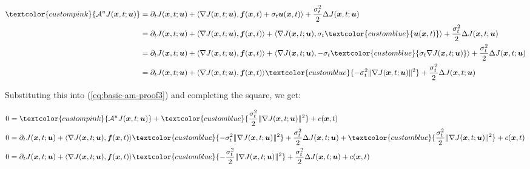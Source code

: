 \documentclass{article}
\newcommand{\bluetext}[1]{\textcolor{customblue}{#1}}
\newcommand{\pinktext}[1]{\textcolor{custompink}{#1}}
\begin{document}
\begin{small}
\begin{align}
    \pinktext{\mathcal{A}^uJ(\boldsymbol{x},t; \boldsymbol{u})}&=\partial_tJ(\boldsymbol{x},t;\boldsymbol{u})+\langle \nabla J(\boldsymbol{x},t;\boldsymbol{u}), \boldsymbol{f}(\boldsymbol{x},t)+\sigma_t\boldsymbol{u}(\boldsymbol{x},t)\rangle+\frac{\sigma_t^2}{2}\Delta J(\boldsymbol{x},t;\boldsymbol{u})\nonumber\\
    &=\partial_tJ(\boldsymbol{x},t;\boldsymbol{u})+\langle \nabla J(\boldsymbol{x},t;\boldsymbol{u}), \boldsymbol{f}(\boldsymbol{x},t)\rangle+\langle \nabla J(\boldsymbol{x},t;\boldsymbol{u}), \sigma_t\bluetext{\boldsymbol{u}(\boldsymbol{x},t)}\rangle +\frac{\sigma_t^2}{2}\Delta J(\boldsymbol{x},t;\boldsymbol{u})\nonumber\\
    &=\partial_tJ(\boldsymbol{x},t;\boldsymbol{u})+\langle \nabla J(\boldsymbol{x},t;\boldsymbol{u}), \boldsymbol{f}(\boldsymbol{x},t)\rangle+\langle \nabla J(\boldsymbol{x},t;\boldsymbol{u}), -\sigma_t\bluetext{\sigma_t\nabla J(\boldsymbol{x},t;\boldsymbol{u})}\rangle +\frac{\sigma_t^2}{2}\Delta J(\boldsymbol{x},t;\boldsymbol{u})\nonumber\\
    &=\partial_tJ(\boldsymbol{x},t;\boldsymbol{u})+\langle \nabla J(\boldsymbol{x},t;\boldsymbol{u}), \boldsymbol{f}(\boldsymbol{x},t)\rangle\bluetext{-\sigma^2_t\|\nabla J(\boldsymbol{x},t;\boldsymbol{u})\|^2} +\frac{\sigma_t^2}{2}\Delta J(\boldsymbol{x},t;\boldsymbol{u})
\end{align}
\end{small}
Substituting this into (\ref{eq:basic-am-proof3}) and completing the square, we get:
\begin{small}
\begin{align}
    0&=\pinktext{\mathcal{A}^uJ(\boldsymbol{x},t; \boldsymbol{u})}+\bluetext{\frac{\sigma^2_t}{2}\|\nabla J(\boldsymbol{x},t;\boldsymbol{u})\|^2}+c(\boldsymbol{x},t)\nonumber\\
    0&=\partial_tJ(\boldsymbol{x},t;\boldsymbol{u})+\langle \nabla J(\boldsymbol{x},t;\boldsymbol{u}), \boldsymbol{f}(\boldsymbol{x},t)\rangle\bluetext{-\sigma^2_t\|\nabla J(\boldsymbol{x},t;\boldsymbol{u})\|^2} +\frac{\sigma_t^2}{2}\Delta J(\boldsymbol{x},t;\boldsymbol{u})+\bluetext{\frac{\sigma^2_t}{2}\|\nabla J(\boldsymbol{x},t;\boldsymbol{u})\|^2}+c(\boldsymbol{x},t)\nonumber\\
    0&=\partial_tJ(\boldsymbol{x},t;\boldsymbol{u})+\langle \nabla J(\boldsymbol{x},t;\boldsymbol{u}), \boldsymbol{f}(\boldsymbol{x},t)\rangle\bluetext{-\frac{\sigma^2_t}{2}\|\nabla J(\boldsymbol{x},t;\boldsymbol{u})\|^2} +\frac{\sigma_t^2}{2}\Delta J(\boldsymbol{x},t;\boldsymbol{u})+c(\boldsymbol{x},t)
\end{align}
\end{small}
\end{document}
